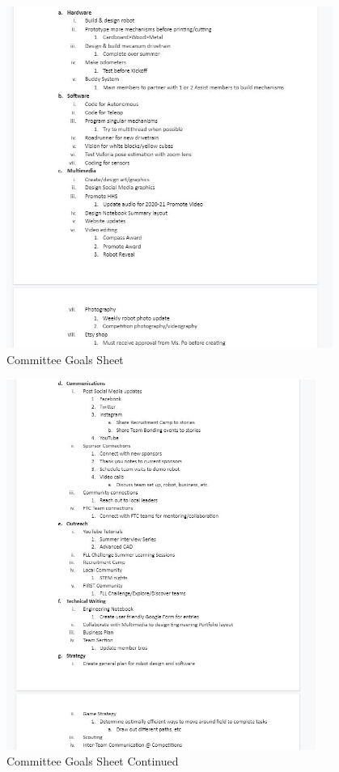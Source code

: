 \begin{figure}[htp]
\centering
\begin{minipage}[b]{.48\textwidth}
	\centering
	\includegraphics[width=0.95\textwidth, angle=0]{Meetings/August/08-10-21/8-10-21_Image3 - Nathan Forrer.JPG}
	\caption{Committee Goals Sheet}
	\label{fig:pic3}
\end{minipage}%
\end{figure}

\begin{figure}[htp]
\centering
\includegraphics[width=0.9\textwidth, angle=0]{Meetings/August/08-10-21/8-10-21_Image4 - Nathan Forrer.JPG}
\caption{Committee Goals Sheet Continued}
\label{fig:pic4}
\end{figure}



